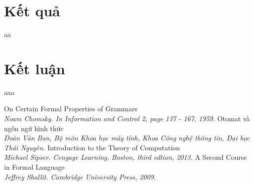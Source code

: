 \documentclass[12pt]{extreport}
\begin{document}
\chapter{Kết quả}
aa
\newpage
\chapter{Kết luận}
aaa

\newpage
\begin{thebibliography}{12}
	On Certain Formal Properties of Grammars\\
	\textit{Noam Chomsky. In Information and Control 2, page 137 - 167, 1959.}
	 Otomat và ngôn ngữ hình thức\\
	\textit{Đoàn Văn Ban, Bộ môn Khoa học máy tính, Khoa Công nghệ thông tin, Đại học Thái Nguyên.}
	Introduction to the Theory of Computation\\
	\textit{Michael Sipser. Cengage Learning, Boston, third edtion, 2013.
	}
	A Second Course in Formal Language\\
	\textit{Jeffrey Shallit. Cambridge University Press, 2009.}
	
	
	
\end{thebibliography}
\end{document}
